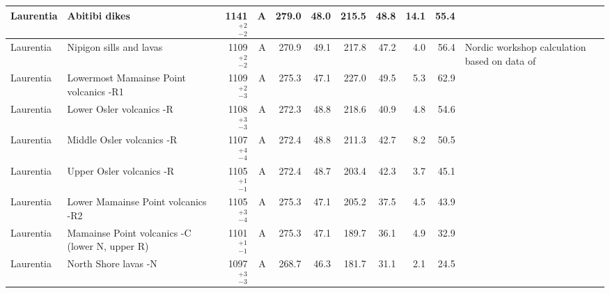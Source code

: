 \documentclass[twocolumn, switch]{article} %
\begin{document}
{\begin{landscape}
\begin{ThreePartTable}
\begin{longtable}{p{1.4 in}p{1.2 in}rrrrrrrrp{1.2 in}}
                     Laurentia &                                      Abitibi dikes &     1141$^{+2}_{-2}$ &      A &     279.0 &      48.0 & 215.5 &  48.8 &      14.1 &        55.4 &                                  \cite{Ernst1993a} \\ \hline                                            Laurentia &                            Nipigon sills and lavas &     1109$^{+2}_{-2}$ &      A &     270.9 &      49.1 & 217.8 &  47.2 &       4.0 &        56.4 &  Nordic workshop calculation based on data of \cite{Palmer1970a, Robertson1971a, Pesonen1979a, Pesonen1979b, Middleton2004a, Borradaile2006a} \\ \hline
                     Laurentia &             Lowermost Mamainse Point volcanics -R1 &     1109$^{+2}_{-3}$ &      A &     275.3 &      47.1 & 227.0 &  49.5 &       5.3 &        62.9 &                         \cite{Swanson-Hysell2014a} \\ \hline
                     Laurentia &                           Lower Osler volcanics -R &     1108$^{+3}_{-3}$ &      A &     272.3 &      48.8 & 218.6 &  40.9 &       4.8 &        54.6 &                         \cite{Swanson-Hysell2014b} \\ \hline
                     Laurentia &                          Middle Osler volcanics -R &     1107$^{+4}_{-4}$ &      A &     272.4 &      48.8 & 211.3 &  42.7 &       8.2 &        50.5 &                         \cite{Swanson-Hysell2014b} \\ \hline
                     Laurentia &                           Upper Osler volcanics -R &     1105$^{+1}_{-1}$ &      A &     272.4 &      48.7 & 203.4 &  42.3 &       3.7 &        45.1 &  \cite{Halls1974a, Swanson-Hysell2014b, Swanson-Hysell2019a} \\ \hline
                     Laurentia &                 Lower Mamainse Point volcanics -R2 &     1105$^{+3}_{-4}$ &      A &     275.3 &      47.1 & 205.2 &  37.5 &       4.5 &        43.9 &                         \cite{Swanson-Hysell2014a} \\ \hline
                     Laurentia &     Mamainse Point volcanics -C (lower N, upper R) &     1101$^{+1}_{-1}$ &      A &     275.3 &      47.1 & 189.7 &  36.1 &       4.9 &        32.9 &                         \cite{Swanson-Hysell2014a} \\ \hline
                     Laurentia &                               North Shore lavas -N &     1097$^{+3}_{-3}$ &      A &     268.7 &      46.3 & 181.7 &  31.1 &       2.1 &        24.5 &              \cite{Tauxe2009a,Swanson-Hysell2019a} \\ \hline

\end{longtable}
\end{ThreePartTable}
\end{landscape}}
\end{document}

